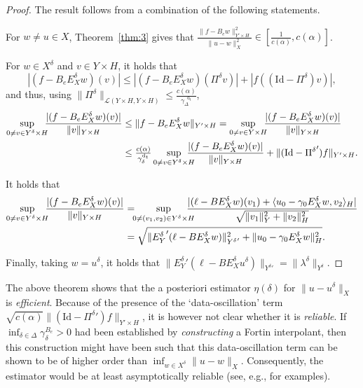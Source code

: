 \documentclass{amsart}
\numberwithin{equation}{section}
\newcommand{\cL}{\mathcal L}
\newcommand{\identity}{\mathrm{Id}}
\newcommand{\1}{\mathbb 1}
\newcommand*\diff{\mathop{}\!\mathrm{d}}
\begin{document}
\begin{proof} The result follows from a combination of the following statements.

For $w \neq u \in X$, Theorem~\ref{thm:3} gives that $\frac{\|f-B_e w\|^2_{Y' \times H}}{\|u-w\|^2_X} \in [\frac{1}{c(\alpha)},c(\alpha)]$.

For $w \in X^\delta$ and $v \in Y \times H$, it holds that
$$
|(f-B_e E_X^\delta w)(v)| \leq |(f-B_e E_X^\delta w)(\Pi^\delta v)|+|f((\identity-\Pi^\delta)v)|,
$$
and thus, using $\|\Pi^\delta\|_{\cL(Y\times H,Y\times H)} \le \frac{c(\alpha)}{\gamma_\Delta^{\diff_t}}$,
\begin{align*}
\sup_{0 \neq v \in Y^\delta \times H} \hspace*{-0.5em} \frac{|(f-B_e E_X^\delta w)(v)|}{\|v\|_{Y \times H}}
& \leq \|f-B_e E_X^\delta w\|_{Y' \times H}=\sup_{0 \neq v \in Y \times H} \hspace*{-0.5em} \frac{|(f-B_e E_X^\delta w)(v)|}{\|v\|_{Y \times H}}
\\
&\leq \tfrac{c(\alpha)}{\gamma^{\diff_t}_\delta} \sup_{0 \neq v \in Y^\delta \times H} \hspace*{-1em} \frac{|(f-B_e E_X^\delta w)(v)|}{\|v\|_{Y \times H}}+
\|(\identity-{\Pi^\delta}') f\|_{Y' \times H}.
\end{align*}

It holds that
\begin{align*}
\sup_{0 \neq v \in Y^\delta \times H} \hspace*{-0.5em}\frac{|(f-B_e E_X^\delta w)(v)|}{\|v\|_{Y \times H}}
&=
 \hspace*{-0.5em} \sup_{0 \neq (v_1,v_2) \in Y^\delta \times H} \hspace*{-1em}\frac{|(\ell-B E_X^\delta w)(v_1)+\langle u_0 -\gamma_0 E_X^\delta w,v_2\rangle_H|}{\sqrt{\|v_1\|_{Y}^2+\|v_2\|_H^2}}\\
&=
\sqrt{\|{E_Y^\delta}'(\ell-B E_X^\delta w)\|_{{Y^\delta}'}^2+\|u_0-\gamma_0 E_X^\delta w\|_H^2}.
\end{align*}

Finally, taking $w = u^\delta$, it holds that $\|{E_Y^\delta}'(\ell-B E_X^\delta u^\delta)\|_{{Y^\delta}'}=\|\lambda^\delta\|_{Y^\delta}$.
\end{proof}

The above theorem shows that the a posteriori estimator $\eta(\delta)$ for $\|u-u^\delta\|_X$ is \emph{efficient}. Because of the presence of the `data-oscillation' term $\sqrt{c(\alpha)} \|(\identity-{\Pi^\delta}' )f\|_{Y'\times H}$, it is however not clear whether it is \emph{reliable}. If $\inf_{\delta \in \Delta} \gamma_\delta^{B_e}>0$ 
had been established by \emph{constructing} a Fortin interpolant, then this construction might have been such that this data-oscillation term can be shown to be of higher order than
$\inf_{w \in X^\delta} \|u-w\|_X$. 
Consequently, the estimator would be at least asymptotically reliable (see, e.g., \cite{35.93556,204.195} for examples).
\end{document}
